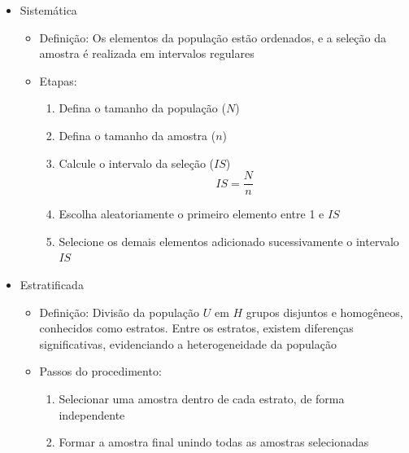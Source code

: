 \documentclass[12pt]{article}
\begin{document}
\begin{itemize}
\begin{itemize}
\begin{itemize}
            \item Requer lista completa da população
            \item Pode ser caro se a amostra for muito dispersa
            \item Não utiliza informações auxiliares
        \end{itemize}
        \item Qual deve ser o tamanho da amostra?
        \begin{itemize}
            \item O tamanho da amostra da
        \end{itemize}
    \end{itemize}
    \item Sistemática
    \begin{itemize}
        \item Definição: Os elementos da população estão ordenados, e a seleção 
        da amostra é realizada em intervalos regulares
        \item Etapas:
        \begin{enumerate}
            \item Defina o tamanho da população ($N$)
            \item Defina o tamanho da amostra ($n$)
            \item Calcule o intervalo da seleção ($IS$)
                \[IS = \frac{N}{n}\]
            \item Escolha aleatoriamente o primeiro elemento entre 1 e $IS$
            \item Selecione os demais elementos adicionado sucessivamente o 
            intervalo $IS$
        \end{enumerate}
    \end{itemize}
    \item Estratificada
    \begin{itemize}
        \item Definição: Divisão da população $U$ em $H$ grupos disjuntos e 
        homogêneos, conhecidos como estratos. Entre os estratos, existem 
        diferenças significativas, evidenciando a heterogeneidade da população
        \item Passos do procedimento:
        \begin{enumerate}
            \item Selecionar uma amostra dentro de cada estrato, de forma 
            independente
            \item Formar a amostra final unindo todas as amostras selecionadas 

\end{enumerate}
\end{itemize}
\end{itemize}
\end{document}
